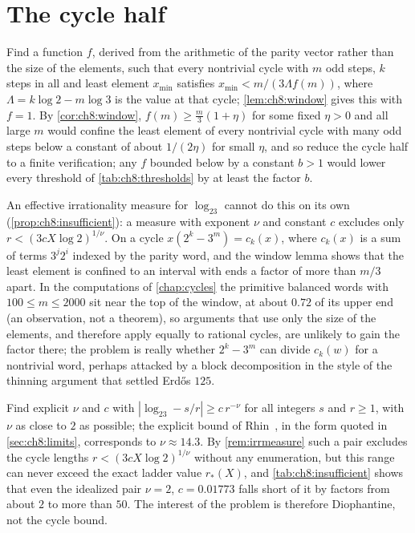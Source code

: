 \section{The cycle half}\label{sec:ch11:cycles}

\begin{problem*}\label{prob:ch11:c1}
Find a function $f$, derived from the arithmetic of the parity vector rather than the size of the elements, such that every nontrivial cycle with $m$ odd steps, $k$ steps in all and least element $x_{\min}$ satisfies $x_{\min}<m/(3\Lambda f(m))$, where $\Lambda=k\log2-m\log3$ is the value at that cycle; \cref{lem:ch8:window} gives this with $f=1$. By \cref{cor:ch8:window}, $f(m)\ge\frac m3(1+\eta)$ for some fixed $\eta>0$ and all large $m$ would confine the least element of every nontrivial cycle with many odd steps below a constant of about $1/(2\eta)$ for small $\eta$, and so reduce the cycle half to a finite verification; any $f$ bounded below by a constant $b>1$ would lower every threshold of \cref{tab:ch8:thresholds} by at least the factor $b$.
\end{problem*}

An effective irrationality measure for
$\log_23$ cannot do this on its own (\cref{prop:ch8:insufficient}):
a measure with exponent $\nu$ and constant $c$ excludes only $r<(3cX\log2)^{1/\nu}$. On a cycle
$x(2^k-3^m)=c_k(x)$, where $c_k(x)$ is a sum of terms $3^j2^i$ indexed by the
parity word, and the window lemma shows that the least element is confined to
an interval with ends a factor of more than $m/3$ apart.
In the computations of \cref{chap:cycles} the primitive balanced words with $100\le m\le2000$ sit near the top of the window, at about $0.72$ of its upper end (an observation, not a theorem), so arguments that use only the size of the elements, and therefore apply equally to rational cycles, are unlikely to gain the factor there; the problem
is really whether $2^k-3^m$ can divide $c_k(w)$ for a nontrivial word, perhaps
attacked by a block decomposition in the style of the thinning argument that
settled Erd\H{o}s $125$.

\begin{problem*}\label{prob:ch11:c2}
Find explicit $\nu$ and $c$ with $|\log_23-s/r|\ge c\,r^{-\nu}$ for all integers $s$ and $r\ge1$, with $\nu$ as close to $2$ as possible; the explicit bound of Rhin~\cite{rhin1987}, in the form quoted in \cref{sec:ch8:limits}, corresponds to $\nu\approx14.3$. By \cref{rem:irrmeasure} such a pair excludes the cycle lengths $r<(3cX\log2)^{1/\nu}$ without any enumeration, but this range can never exceed the exact ladder value $r_*(X)$, and \cref{tab:ch8:insufficient} shows that even the idealized pair $\nu=2$, $c=0.01773$ falls short of it by factors from about $2$ to more than $50$. The interest of the problem is therefore Diophantine, not the cycle bound.
\end{problem*}

